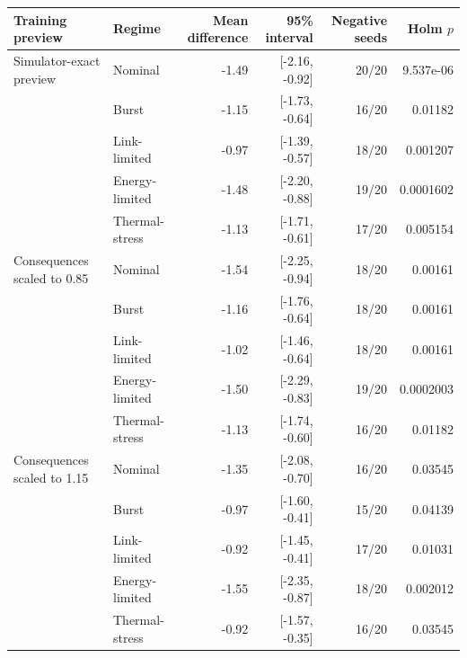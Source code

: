\begin{tabular}{llrrrr}
\toprule
Training preview & Regime & Mean difference & 95\% interval & Negative seeds & Holm $p$ \\
\midrule
Simulator-exact preview & Nominal & -1.49 & [-2.16, -0.92] & 20/20 & 9.537e-06 \\
 & Burst & -1.15 & [-1.73, -0.64] & 16/20 & 0.01182 \\
 & Link-limited & -0.97 & [-1.39, -0.57] & 18/20 & 0.001207 \\
 & Energy-limited & -1.48 & [-2.20, -0.88] & 19/20 & 0.0001602 \\
 & Thermal-stress & -1.13 & [-1.71, -0.61] & 17/20 & 0.005154 \\
\addlinespace
Consequences scaled to 0.85 & Nominal & -1.54 & [-2.25, -0.94] & 18/20 & 0.00161 \\
 & Burst & -1.16 & [-1.76, -0.64] & 18/20 & 0.00161 \\
 & Link-limited & -1.02 & [-1.46, -0.64] & 18/20 & 0.00161 \\
 & Energy-limited & -1.50 & [-2.29, -0.83] & 19/20 & 0.0002003 \\
 & Thermal-stress & -1.13 & [-1.74, -0.60] & 16/20 & 0.01182 \\
\addlinespace
Consequences scaled to 1.15 & Nominal & -1.35 & [-2.08, -0.70] & 16/20 & 0.03545 \\
 & Burst & -0.97 & [-1.60, -0.41] & 15/20 & 0.04139 \\
 & Link-limited & -0.92 & [-1.45, -0.41] & 17/20 & 0.01031 \\
 & Energy-limited & -1.55 & [-2.35, -0.87] & 18/20 & 0.002012 \\
 & Thermal-stress & -0.92 & [-1.57, -0.35] & 16/20 & 0.03545 \\
\bottomrule
\end{tabular}